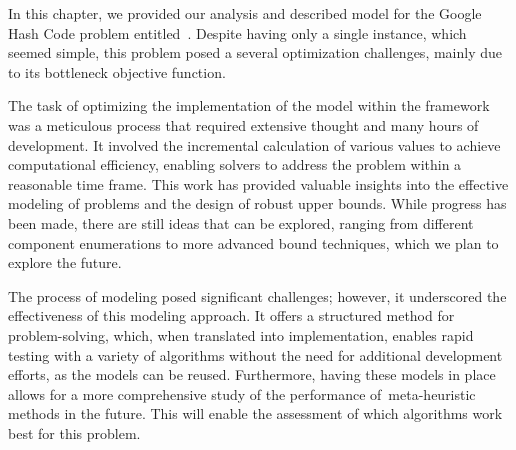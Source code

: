 In this chapter, we provided our analysis and described model for the Google Hash
Code problem entitled~.
Despite having only a single instance, which seemed simple, this problem posed a
several optimization challenges, mainly due to its bottleneck objective
function.

The task of optimizing the implementation of the model within the framework was
a meticulous process that required extensive thought and many hours of
development. It involved the incremental calculation of various values to
achieve computational efficiency, enabling solvers to address the problem within
a reasonable time frame. This work has provided valuable insights into the
effective modeling of problems and the design of robust upper bounds. While
progress has been made, there are still ideas that can be explored, ranging from
different component enumerations to more advanced bound techniques, which we
plan to explore the future.

The process of modeling posed significant challenges; however, it underscored
the effectiveness of this modeling approach. It offers a structured method for
problem-solving, which, when translated into implementation, enables rapid
testing with a variety of algorithms without the need for additional development
efforts, as the models can be reused. Furthermore, having these models in place
allows for a more comprehensive study of the performance
of~\acrshort{meta-heuristic} methods in the future. This will enable the
assessment of which algorithms work best for this problem.